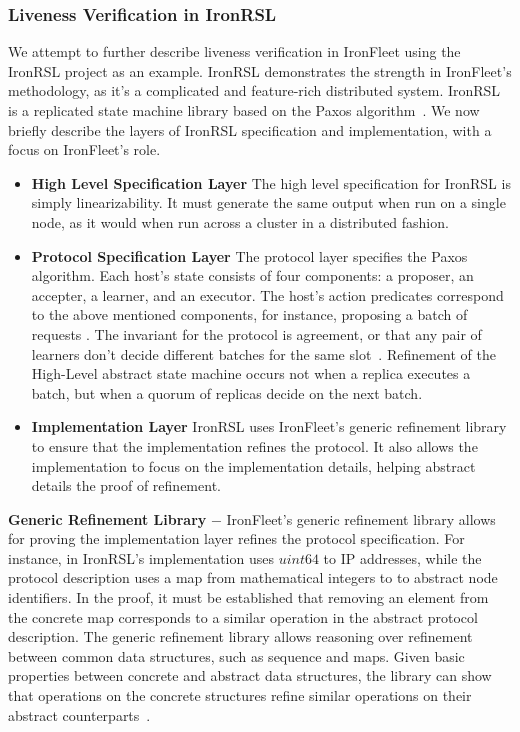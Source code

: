 \documentclass{llncs}
\begin{document}
\subsubsection{Liveness Verification in IronRSL}
We attempt to further describe liveness verification in IronFleet using the IronRSL project as 
an example. IronRSL demonstrates the strength in IronFleet's methodology, as it's a 
complicated and feature-rich distributed system. IronRSL is a replicated state machine library
based on the Paxos algorithm~\cite{paxos}. We now briefly describe the layers of IronRSL specification
and implementation, with a focus on IronFleet's role.
\begin{itemize}
\item \textbf{High Level Specification Layer} The high level specification for IronRSL is simply linearizability.
    It must generate the same output when run on a single node, as it would when run across a cluster in a 
    distributed fashion.

\item \textbf{Protocol Specification Layer} The protocol layer specifies the Paxos algorithm. Each host's state 
    consists of four components: a proposer, an accepter, a learner, and an executor. The host's action 
    predicates correspond to the above mentioned components, for instance, proposing a batch of requests 
    . The invariant for the protocol is agreement, or that any pair of learners don't 
    decide different batches for the same slot~\cite{ironfleet}. Refinement of the High-Level abstract state machine
    occurs not when a replica executes a batch, but when a quorum of replicas decide on the next batch.

\item \textbf{Implementation Layer} IronRSL uses IronFleet's generic refinement library to ensure that 
    the implementation refines the protocol. It also allows the implementation to focus on the implementation
    details, helping abstract details the proof of refinement.    

\end{itemize}


\textbf{Generic Refinement Library} $-$ IronFleet's generic refinement library allows for proving the implementation 
layer refines the protocol specification. For instance, in IronRSL's implementation uses $uint64$ to 
IP addresses, while the protocol description uses a map from mathematical integers to to abstract node identifiers.
In the proof, it must be established that removing an element from the concrete map corresponds to a similar 
operation in the abstract protocol description. The generic refinement library allows reasoning over 
refinement between common data structures, such as sequence and maps. Given basic properties between concrete and
abstract data structures, the library can show that operations on the concrete structures refine similar operations
on their abstract counterparts~\cite{ironfleet}.
\end{document}
